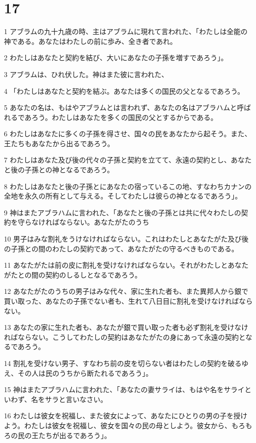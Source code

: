 \chapter{17}

\par 1 アブラムの九十九歳の時、主はアブラムに現れて言われた、「わたしは全能の神である。あなたはわたしの前に歩み、全き者であれ。
\par 2 わたしはあなたと契約を結び、大いにあなたの子孫を増すであろう」。
\par 3 アブラムは、ひれ伏した。神はまた彼に言われた、
\par 4 「わたしはあなたと契約を結ぶ。あなたは多くの国民の父となるであろう。
\par 5 あなたの名は、もはやアブラムとは言われず、あなたの名はアブラハムと呼ばれるであろう。わたしはあなたを多くの国民の父とするからである。
\par 6 わたしはあなたに多くの子孫を得させ、国々の民をあなたから起そう。また、王たちもあなたから出るであろう。
\par 7 わたしはあなた及び後の代々の子孫と契約を立てて、永遠の契約とし、あなたと後の子孫との神となるであろう。
\par 8 わたしはあなたと後の子孫とにあなたの宿っているこの地、すなわちカナンの全地を永久の所有として与える。そしてわたしは彼らの神となるであろう」。
\par 9 神はまたアブラハムに言われた、「あなたと後の子孫とは共に代々わたしの契約を守らなければならない。あなたがたのうち
\par 10 男子はみな割礼をうけなければならない。これはわたしとあなたがた及び後の子孫との間のわたしの契約であって、あなたがたの守るべきものである。
\par 11 あなたがたは前の皮に割礼を受けなければならない。それがわたしとあなたがたとの間の契約のしるしとなるであろう。
\par 12 あなたがたのうちの男子はみな代々、家に生れた者も、また異邦人から銀で買い取った、あなたの子孫でない者も、生れて八日目に割礼を受けなければならない。
\par 13 あなたの家に生れた者も、あなたが銀で買い取った者も必ず割礼を受けなければならない。こうしてわたしの契約はあなたがたの身にあって永遠の契約となるであろう。
\par 14 割礼を受けない男子、すなわち前の皮を切らない者はわたしの契約を破るゆえ、その人は民のうちから断たれるであろう」。
\par 15 神はまたアブラハムに言われた、「あなたの妻サライは、もはや名をサライといわず、名をサラと言いなさい。
\par 16 わたしは彼女を祝福し、また彼女によって、あなたにひとりの男の子を授けよう。わたしは彼女を祝福し、彼女を国々の民の母としよう。彼女から、もろもろの民の王たちが出るであろう」。
